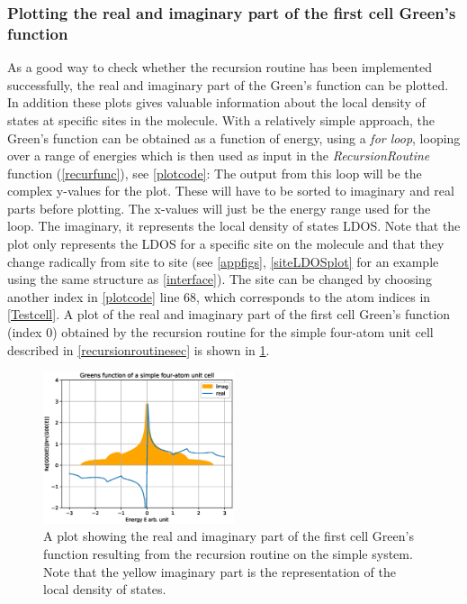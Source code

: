\subsubsection{Plotting the real and imaginary part of the first cell Green's function}
As a good way to check whether the recursion routine has been implemented successfully, the real and imaginary part of the Green's function can be plotted. In addition these plots gives valuable information about the local density of states at specific sites in the molecule. With a relatively simple approach, the Green's function can be obtained as a function of energy, using a \textit{for loop}, looping over a range of energies which is then used as input in the \textit{RecursionRoutine} function (\cref{recurfunc}), see \cref{plotcode}:
\vspace{-1\baselineskip}
\vspace{\baselineskip}
The output from this loop will be the complex y-values for the plot. These will have to be sorted to imaginary and real parts before plotting. The x-values will just be the energy range used for the loop. The imaginary, it represents the local density of states LDOS. Note that the plot only represents the LDOS for a specific site on the molecule and that they change radically from site to site (see \cref{appfigs}, \cref{siteLDOSplot} for an example using the same structure as \cref{interface}). The site can be changed by choosing another index in \cref{plotcode} line 68, which corresponds to the atom indices in \cref{Testcell}. A plot of the real and imaginary part of the first cell Green's function (index 0) obtained by the recursion routine for the simple four-atom unit cell described in \cref{recursionroutinesec} is shown in \cref{imrealplot}.
\begin{figure}
	\centering
	\includegraphics[width = 0.5\textwidth]{Figures/imrealplot.eps}
	\caption{A plot showing the real and imaginary part of the first cell Green's function resulting from the recursion routine on the simple system. Note that the yellow imaginary part is the representation of the local density of states.}
	\label{imrealplot}
\end{figure}
